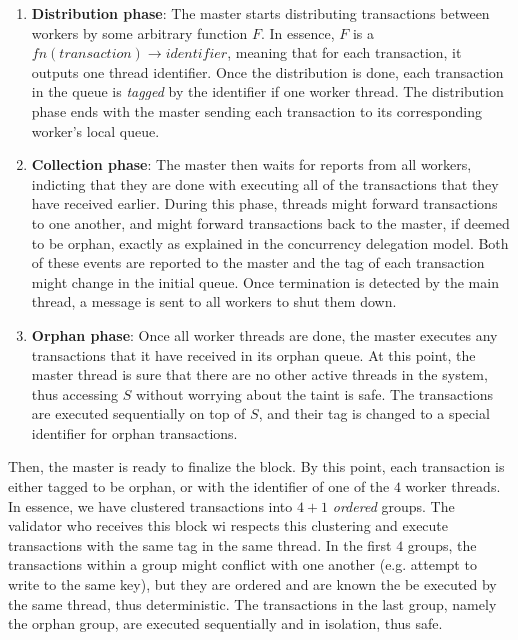 \begin{enumerate}
	\item \textbf{Distribution phase}: The master starts distributing transactions between workers
	by some arbitrary function $F$. In essence, $F$ is a $fn(transaction) \rightarrow identifier$,
	meaning that for each transaction, it outputs one thread identifier. Once the distribution is
	done, each transaction in the queue is \textit{tagged} by the identifier if one worker thread.
	The distribution phase ends with the master sending each transaction to its corresponding
	worker's local queue.

	\item \textbf{Collection phase}: The master then waits for reports from all workers,
	indicting that they are done with executing all of the transactions that they have received
	earlier. During this phase, threads might forward transactions to one another, and might forward
	transactions back to the master, if deemed to be orphan, exactly as explained in the concurrency
	delegation model. Both of these events are reported to the master and the tag of each
	transaction might change in the initial queue. Once termination is detected by the main thread,
	a message is sent to all workers to shut them down.

	\item \textbf{Orphan phase}: Once all worker threads are done, the master executes any
	transactions that it have received in its orphan queue. At this point, the master thread is sure
	that there are no other active threads in the system, thus accessing $S$ without worrying about
	the taint is safe. The transactions are executed sequentially on top of $S$, and their tag is
	changed to a special identifier for orphan transactions.
\end{enumerate}

Then, the master is ready to finalize the block. By this point, each transaction is either tagged to
be orphan, or with the identifier of one of the $4$ worker threads. In essence, we have clustered
transactions into $4 + 1$ \textit{ordered} groups. The validator who receives this block wi
respects this clustering and execute transactions with the same tag in the same thread. In the first
$4$ groups, the transactions within a group might conflict with one another (e.g. attempt to write
to the same key), but they are ordered and are known the be executed by the same thread, thus
deterministic. The transactions in the last group, namely the orphan group, are executed
sequentially and in isolation, thus safe.

